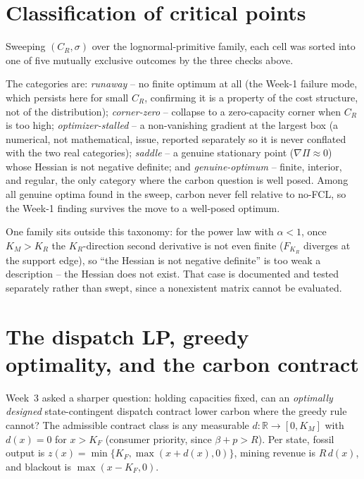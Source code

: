 \section{Classification of critical points}
\label{sec:r2-week2-classify}

Sweeping $(C_R,\sigma)$ over the lognormal-primitive family, each cell was sorted
into one of five mutually exclusive outcomes by the three checks above.

\begin{remark}
\label{rem:r2-taxonomy}
The categories are: \emph{runaway} -- no finite optimum at all (the Week-1
failure mode, which persists here for small $C_R$, confirming it is a property of
the cost structure, not of the distribution); \emph{corner-zero} -- collapse to a
zero-capacity corner when $C_R$ is too high; \emph{optimizer-stalled} -- a
non-vanishing gradient at the largest box (a numerical, not mathematical, issue,
reported separately so it is never conflated with the two real categories);
\emph{saddle} -- a genuine stationary point ($\nabla\Pi\approx0$) whose Hessian is
not negative definite; and \emph{genuine-optimum} -- finite, interior, and
regular, the only category where the carbon question is well posed. Among all
genuine optima found in the sweep, carbon never fell relative to no-FCL, so the
Week-1 finding survives the move to a well-posed optimum.
\end{remark}

One family sits outside this taxonomy: for the power law with $\alpha<1$, once
$K_M>K_R$ the $K_R$-direction second derivative is not even finite ($F_{K_R}$
diverges at the support edge), so ``the Hessian is not negative definite'' is too
weak a description -- the Hessian does not exist. That case is documented and
tested separately rather than swept, since a nonexistent matrix cannot be
evaluated.

\section{The dispatch LP, greedy optimality, and the carbon contract}
\label{sec:r2-week3-lp}

Week~3 asked a sharper question: holding capacities fixed, can an
\emph{optimally designed} state-contingent dispatch contract lower carbon where
the greedy rule cannot? The admissible contract class is any measurable
$d:\mathbb{R}\to[0,K_M]$ with $d(x)=0$ for $x>K_F$ (consumer priority, since
$\beta+p>R$). Per state, fossil output is $z(x)=\min\{K_F,\max(x+d(x),0)\}$,
mining revenue is $R\,d(x)$, and blackout is $\max(x-K_F,0)$.

